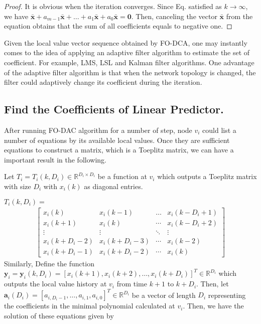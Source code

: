 \begin{proof}
It is obvious when the iteration converges. Since Eq.
satisfied as $k\to\infty$, we have $\bar{\mathbf{x}}+a_{m-1}\bar{\mathbf{x}}+\ldots+a_{1}\bar{\mathbf{x}}+a_{0}\bar{\mathbf{x}}=\mathbf{0}$.
Then, canceling the vector $\bar{\mathbf{x}}$ from the equation obtains
that the sum of all coefficients equals to negative one. 
\end{proof}
Given the local value vector sequence obtained by FO-DCA, one may
instantly comes to the idea of applying an adaptive filter algorithm
to estimate the set of coefficient. For example, LMS, LSL and Kalman
filter algorithms. One advantage of the adaptive filter algorithm
is that when the network topology is changed, the filter could adaptively
change its coefficient during the iteration. 


\subsection*{Find the Coefficients of Linear Predictor.}

After running FO-DAC algorithm for a number of step, node $v_{i}$
could list a number of equations by its available local values. Once
they are sufficient equations to construct a matrix, which is a Toeplitz
matrix, we can have a important result in the following.

Let  $T_{i}=T_{i}\left(k,D_{i}\right)\in\mathbb{R}^{D_{i}\times D_{i}}$
be a function at $v_{i}$ which outputs a Toeplitz matrix with size
$D_{i}$ with $x_{i}\left(k\right)$ as diagonal entries.

$T_{i}\left(k,D_{i}\right)=$ 
\begin{align}
\left[\begin{array}{cccc}
x_{i}\left(k\right) & x_{i}\left(k-1\right) & \ldots & x_{i}\left(k-D_{i}+1\right)\\
x_{i}\left(k+1\right) & x_{i}\left(k\right) & \cdots & x_{i}\left(k-D_{i}+2\right)\\
\vdots & \vdots & \ddots & \vdots\\
x_{i}\left(k+D_{i}-2\right) & x_{i}\left(k+D_{i}-3\right) & \cdots & x_{i}\left(k-2\right)\\
x_{i}\left(k+D_{i}-1\right) & x_{i}\left(k+D_{i}-2\right) & \cdots & x_{i}\left(k\right)
\end{array}\right]\label{eq:Toeplitz_i simple-1}
\end{align}
Similarly, Define the function $\mathbf{y}_{i}=\mathbf{y}_{i}\left(k,D_{i}\right)=\left[x_{i}\left(k+1\right),x_{i}\left(k+2\right),\ldots,x_{i}\left(k+D_{i}\right)\right]^{T}\in\mathbb{R}^{D_{i}}$
which outputs the local value history at $v_{i}$ from time $k+1$
to $k+D_{i}$.  Then, let $\mathbf{a}_{i}\left(D_{i}\right)=\left[a_{i,D_{i}-1},\ldots,a_{i,1},a_{i,0}\right]^{T}\in\mathbb{R}^{D_{i}}$
be a vector of length $D_{i}$ representing the coefficients in the
minimal polynomial calculated at $v_{i}$. Then, we have the solution
of these equations given by

